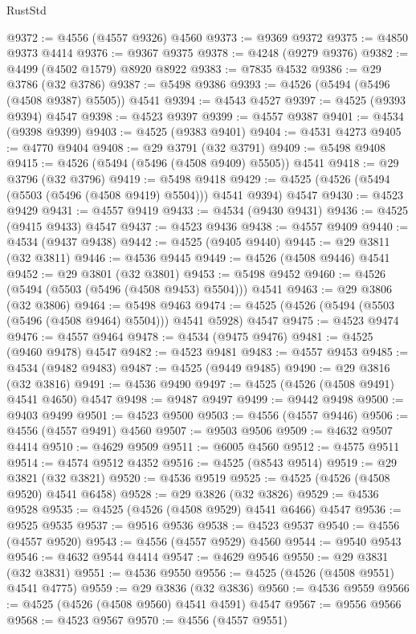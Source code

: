\begin{lexlean}{RustStd}
\begin{coremodule}
{\begin{coremodule}
{{{{{{{{{{{{{{{{{{{{{{{{{{{{{{{{{{{{{{{{{{{{{{{{{{{{{{{@9372 := @4556 (@4557 @9326) @4560
@9373 := @9369 @9372
@9375 := @4850 @9373 @4414
@9376 := @9367 @9375
@9378 := @4248 (@9279 @9376)
@9382 := @4499 (@4502 @1579) @8920 @8922
@9383 := @7835 @4532
@9386 := @29 @3786 (@32 @3786)
@9387 := @5498 @9386
@9393 := @4526 (@5494 (@5496 (@4508 @9387) @5505)) @4541
@9394 := @4543 @4527
@9397 := @4525 (@9393 @9394) @4547
@9398 := @4523 @9397
@9399 := @4557 @9387
@9401 := @4534 (@9398 @9399)
@9403 := @4525 (@9383 @9401)
@9404 := @4531 @4273
@9405 := @4770 @9404
@9408 := @29 @3791 (@32 @3791)
@9409 := @5498 @9408
@9415 := @4526 (@5494 (@5496 (@4508 @9409) @5505)) @4541
@9418 := @29 @3796 (@32 @3796)
@9419 := @5498 @9418
@9429 := @4525 (@4526 (@5494 (@5503 (@5496 (@4508 @9419) @5504))) @4541 @9394) @4547
@9430 := @4523 @9429
@9431 := @4557 @9419
@9433 := @4534 (@9430 @9431)
@9436 := @4525 (@9415 @9433) @4547
@9437 := @4523 @9436
@9438 := @4557 @9409
@9440 := @4534 (@9437 @9438)
@9442 := @4525 (@9405 @9440)
@9445 := @29 @3811 (@32 @3811)
@9446 := @4536 @9445
@9449 := @4526 (@4508 @9446) @4541
@9452 := @29 @3801 (@32 @3801)
@9453 := @5498 @9452
@9460 := @4526 (@5494 (@5503 (@5496 (@4508 @9453) @5504))) @4541
@9463 := @29 @3806 (@32 @3806)
@9464 := @5498 @9463
@9474 := @4525 (@4526 (@5494 (@5503 (@5496 (@4508 @9464) @5504))) @4541 @5928) @4547
@9475 := @4523 @9474
@9476 := @4557 @9464
@9478 := @4534 (@9475 @9476)
@9481 := @4525 (@9460 @9478) @4547
@9482 := @4523 @9481
@9483 := @4557 @9453
@9485 := @4534 (@9482 @9483)
@9487 := @4525 (@9449 @9485)
@9490 := @29 @3816 (@32 @3816)
@9491 := @4536 @9490
@9497 := @4525 (@4526 (@4508 @9491) @4541 @4650) @4547
@9498 := @9487 @9497
@9499 := @9442 @9498
@9500 := @9403 @9499
@9501 := @4523 @9500
@9503 := @4556 (@4557 @9446)
@9506 := @4556 (@4557 @9491) @4560
@9507 := @9503 @9506
@9509 := @4632 @9507 @4414
@9510 := @4629 @9509
@9511 := @6005 @4560
@9512 := @4575 @9511
@9514 := @4574 @9512 @4352
@9516 := @4525 (@8543 @9514)
@9519 := @29 @3821 (@32 @3821)
@9520 := @4536 @9519
@9525 := @4525 (@4526 (@4508 @9520) @4541 @6458)
@9528 := @29 @3826 (@32 @3826)
@9529 := @4536 @9528
@9535 := @4525 (@4526 (@4508 @9529) @4541 @6466) @4547
@9536 := @9525 @9535
@9537 := @9516 @9536
@9538 := @4523 @9537
@9540 := @4556 (@4557 @9520)
@9543 := @4556 (@4557 @9529) @4560
@9544 := @9540 @9543
@9546 := @4632 @9544 @4414
@9547 := @4629 @9546
@9550 := @29 @3831 (@32 @3831)
@9551 := @4536 @9550
@9556 := @4525 (@4526 (@4508 @9551) @4541 @4775)
@9559 := @29 @3836 (@32 @3836)
@9560 := @4536 @9559
@9566 := @4525 (@4526 (@4508 @9560) @4541 @4591) @4547
@9567 := @9556 @9566
@9568 := @4523 @9567
@9570 := @4556 (@4557 @9551)
}}}}}}}}}}}}}}}}}}}}}}}}}}}}}}}}}}}}}}}}}}}}}}}}}}}}}}}
\end{coremodule}}
\end{coremodule}
\end{lexlean}
